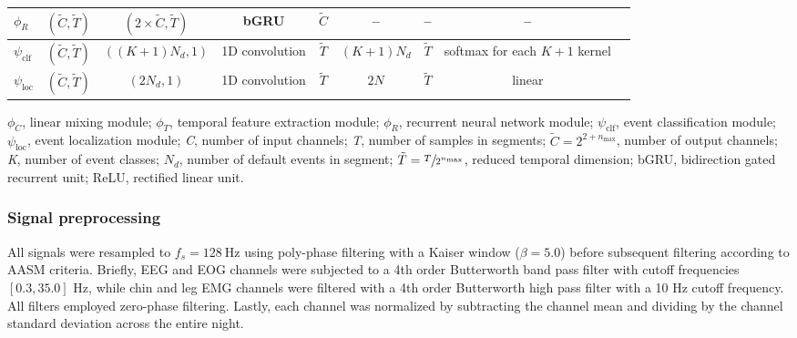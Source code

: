 \begin{landscape}
\begin{table}
\begin{threeparttable}
\begin{tabular}{lcccccccc}
    \rowcolor{lightlightgray} $\phi_{R}$ & $(\tilde{C}, \tilde{T})$ & $(2\times \tilde{C}, \tilde{T})$ & bGRU & $\tilde{C}$ & -- & -- & -- & \\ \midrule
    $\psi_{\mathrm{clf}}$                                      & $(\tilde{C}, \tilde{T})$                   & $\left( \left( K + 1 \right) N_{d}, 1 \right)$ & 1D convolution & $\tilde{T}$ & $\left( K + 1 \right) N_{d}$ & $\tilde{T}$ & softmax for each $K+1$ kernel \\
    $\psi_{\mathrm{loc}}$                                      & $(\tilde{C}, \tilde{T})$                   & $\left( 2 N_{d}, 1 \right)$                    & 1D convolution & $\tilde{T}$ & $2 N$                        & $\tilde{T}$ & linear \\ \bottomrule
  \end{tabular}
  \begin{tablenotes}
  \item $\phi_C$, linear mixing module; $\phi_{T}$, temporal feature extraction module; $\phi_{R}$, recurrent neural network module; $\psi_{\mathrm{clf}}$, event classification module; $\psi_{\mathrm{loc}}$, event localization module; \textit{C}, number of input channels; \textit{T}, number of samples in segments; $\tilde{C}=2^{2+n_{\max}}$, number of output channels; \textit{K}, number of event classes; $N_{d}$, number of default events in segment; $\tilde{T}=\sfrac{T}{2^{n_{\max}}}$, reduced temporal dimension; bGRU, bidirection gated recurrent unit; ReLU, rectified linear unit.
  \end{tablenotes}
\end{threeparttable}
\end{table}
\end{landscape}

\subsubsection{Signal preprocessing}
All signals were resampled to $f_s = \SI{128}{\hertz}$ using poly-phase filtering with a Kaiser window ($\beta = 5.0$) before subsequent filtering according to \ac{AASM} criteria.
Briefly, \ac{EEG} and \ac{EOG} channels were subjected to a 4th order Butterworth band pass filter with cutoff frequencies $\left[ 0.3, 35.0 \right]$ Hz, while chin and leg \ac{EMG} channels were filtered with a 4th order Butterworth high pass filter with a 10 Hz cutoff frequency.
All filters employed zero-phase filtering.
Lastly, each channel was normalized by subtracting the channel mean and dividing by the channel standard deviation across the entire night.

